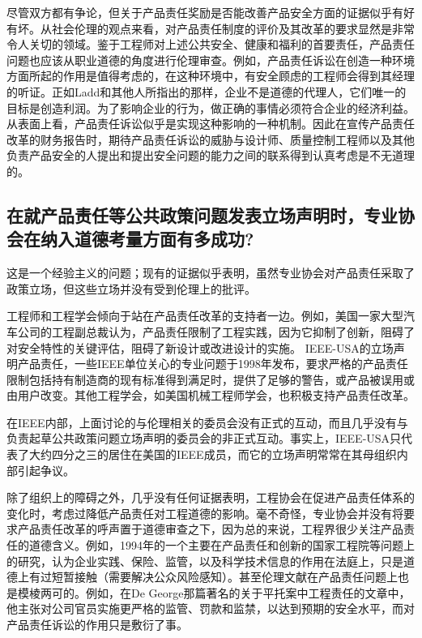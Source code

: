 \documentclass[lang=cn,11pt,a4paper]{elegantpaper}
\begin{document}
尽管双方都有争论，但关于产品责任奖励是否能改善产品安全方面的证据似乎有好有坏。\cite{22}从社会伦理的观点来看，对产品责任制度的评价及其改革的要求显然是非常令人关切的领域。鉴于工程师对上述公共安全、健康和福利的首要责任，产品责任问题也应该从职业道德的角度进行伦理审查。例如，产品责任诉讼在创造一种环境方面所起的作用是值得考虑的，在这种环境中，有安全顾虑的工程师会得到其经理的听证。正如Ladd\cite{16}和其他人所指出的那样，企业不是道德的代理人，它们唯一的目标是创造利润。为了影响企业的行为，做正确的事情必须符合企业的经济利益。从表面上看，产品责任诉讼似乎是实现这种影响的一种机制。因此在宣传产品责任改革的财务报告时，期待产品责任诉讼的威胁与设计师、质量控制工程师以及其他负责产品安全的人提出和提出安全问题的能力之间的联系得到认真考虑是不无道理的。    

\subsection{在就产品责任等公共政策问题发表立场声明时，专业协会在纳入道德考量方面有多成功?}
这是一个经验主义的问题；现有的证据似乎表明，虽然专业协会对产品责任采取了政策立场，但这些立场并没有受到伦理上的批评。

工程师和工程学会倾向于站在产品责任改革的支持者一边。例如，美国一家大型汽车公司的工程副总裁认为，产品责任限制了工程实践，因为它抑制了创新，阻碍了对安全特性的关键评估，阻碍了新设计或改进设计的实施。\cite{24} IEEE-USA的立场声明产品责任，一些IEEE单位关心的专业问题\cite{25}于1998年发布，要求严格的产品责任限制包括持有制造商的现有标准得到满足时，提供了足够的警告，或产品被误用或由用户改变。其他工程学会，如美国机械工程师学会\cite{26}，也积极支持产品责任改革。

在IEEE内部，上面讨论的与伦理相关的委员会没有正式的互动，而且几乎没有与负责起草公共政策问题立场声明的委员会的非正式互动。事实上，IEEE-USA只代表了大约四分之三的居住在美国的IEEE成员，而它的立场声明常常在其母组织内部引起争议。

除了组织上的障碍之外，几乎没有任何证据表明，工程协会在促进产品责任体系的变化时，考虑过降低产品责任对工程道德的影响。毫不奇怪，专业协会并没有将要求产品责任改革的呼声置于道德审查之下，因为总的来说，工程界很少关注产品责任的道德含义。例如，1994年的一个主要在产品责任和创新的国家工程院等问题上的研究\cite{24}，认为企业实践、保险、监管，以及科学技术信息的作用在法庭上，只是道德上有过短暂接触（需要解决公众风险感知）\cite{27}。甚至伦理文献在产品责任问题上也是模棱两可的。\cite{28}例如，在De George那篇著名的关于平托案中工程责任的文章中\cite{29}，他主张对公司官员实施更严格的监管、罚款和监禁，以达到预期的安全水平，而对产品责任诉讼的作用只是敷衍了事。
\end{document}
